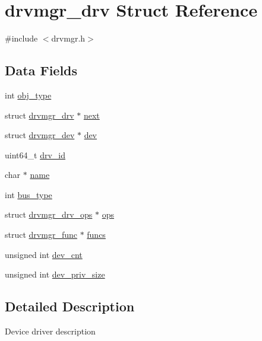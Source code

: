 \hypertarget{structdrvmgr__drv}{}\section{drvmgr\+\_\+drv Struct Reference}
\label{structdrvmgr__drv}


{\ttfamily \#include $<$drvmgr.\+h$>$}

\subsection*{Data Fields}
\begin{DoxyCompactItemize}
\item 
int \mbox{\hyperlink{structdrvmgr__drv_ad6df87e2ef686e0aa0b3bed3f46b2590}{obj\+\_\+type}}
\item 
struct \mbox{\hyperlink{structdrvmgr__drv}{drvmgr\+\_\+drv}} $\ast$ \mbox{\hyperlink{structdrvmgr__drv_a5544e016abaca51a2baaa32406d13528}{next}}
\item 
struct \mbox{\hyperlink{structdrvmgr__dev}{drvmgr\+\_\+dev}} $\ast$ \mbox{\hyperlink{structdrvmgr__drv_ac3340a7ceff44d4bd013823fc45338dc}{dev}}
\item 
uint64\+\_\+t \mbox{\hyperlink{structdrvmgr__drv_ad7bea4ea7a3a8587b64b82e9b7c9171f}{drv\+\_\+id}}
\item 
char $\ast$ \mbox{\hyperlink{structdrvmgr__drv_a3f6e66aed68f0b6b8ad484ed524da08a}{name}}
\item 
int \mbox{\hyperlink{structdrvmgr__drv_ae555ca5e714134cbf25cfb7a6346ed8c}{bus\+\_\+type}}
\item 
struct \mbox{\hyperlink{structdrvmgr__drv__ops}{drvmgr\+\_\+drv\+\_\+ops}} $\ast$ \mbox{\hyperlink{structdrvmgr__drv_a6d7671f3f2f42f4536cf1acbd0650405}{ops}}
\item 
struct \mbox{\hyperlink{structdrvmgr__func}{drvmgr\+\_\+func}} $\ast$ \mbox{\hyperlink{structdrvmgr__drv_a88e8e7dc6c20831cb09ad4ad8caf5151}{funcs}}
\item 
unsigned int \mbox{\hyperlink{structdrvmgr__drv_a5ea883c06b15c9191d0e7a030ee2b4ce}{dev\+\_\+cnt}}
\item 
unsigned int \mbox{\hyperlink{structdrvmgr__drv_a9a94cfbbae8181703102dc9efb241db9}{dev\+\_\+priv\+\_\+size}}
\end{DoxyCompactItemize}


\subsection{Detailed Description}
Device driver description 

